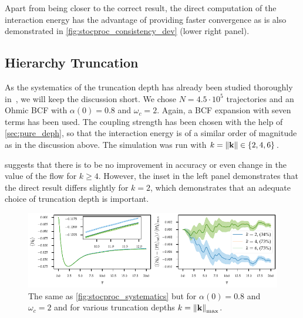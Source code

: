 Apart from being closer to the correct result, the direct computation
of the interaction energy has the advantage of providing faster
convergence as is also demonstrated in
\cref{fig:stocproc_consistency_dev} (lower right panel).

\subsection{Hierarchy Truncation}
\label{sec:trunc}
As the systematics of the truncation depth has already been studied
thoroughly in~\cite{RichardDiss,Hartmann2021Aug}, we will keep the
discussion short.  We chose \(N=4.5 \cdot 10^5\) trajectories and an
Ohmic BCF with \(α(0)=0.8\) and \(ω_c=2\). Again, a BCF expansion with
seven terms has been used. The coupling strength has been chosen with
the help of \cref{sec:pure_deph}, so that the interaction energy is of
a similar order of magnitude as in the discussion above. The
simulation was run with \(k=\norm{\vb{k}}\in \{2,4,6\}\).

 suggests that there is to be no improvement
in accuracy or even change in the value of the flow for
\(k\geq 4\). However, the inset in the left panel
demonstrates that the direct result differs slightly for
\(k = 2\), which demonstrates that an adequate choice of
truncation depth is important.
\begin{figure}[htp]
  \centering
  \includegraphics{figs/one_bath_syst/k_systematics_interaction}
  \caption{\label{fig:k_systematics} The same as
    \cref{fig:stocproc_systematics} but for \(α(0)=0.8\) and
    \(ω_c=2\) and for various truncation depths \(k=\norm{\vb{k}}_{\mathrm{max}}\).}
\end{figure}

